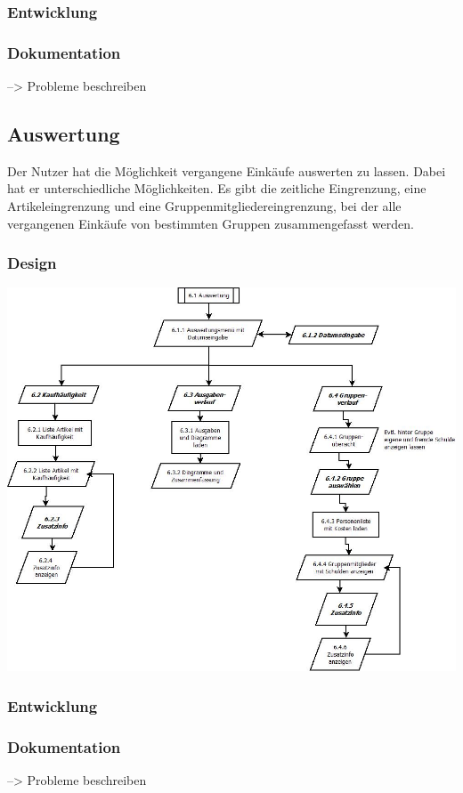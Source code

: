 \documentclass[12pt,a4paper]{article}
\begin{document}
\subsubsection*{Entwicklung}

\subsubsection*{Dokumentation} --> Probleme beschreiben
\newpage

\subsection{Auswertung}
Der Nutzer hat die Möglichkeit vergangene Einkäufe auswerten zu lassen. Dabei hat er unterschiedliche Möglichkeiten.  Es gibt die zeitliche Eingrenzung, eine Artikeleingrenzung und eine Gruppenmitgliedereingrenzung, bei der alle vergangenen Einkäufe von bestimmten Gruppen zusammengefasst werden.
\subsubsection*{Design}
\includegraphics[scale=0.6, origin=l]{060 Auswertungen.jpeg}
\subsubsection*{Entwicklung}

\subsubsection*{Dokumentation} --> Probleme beschreiben
\newpage
\end{document}
